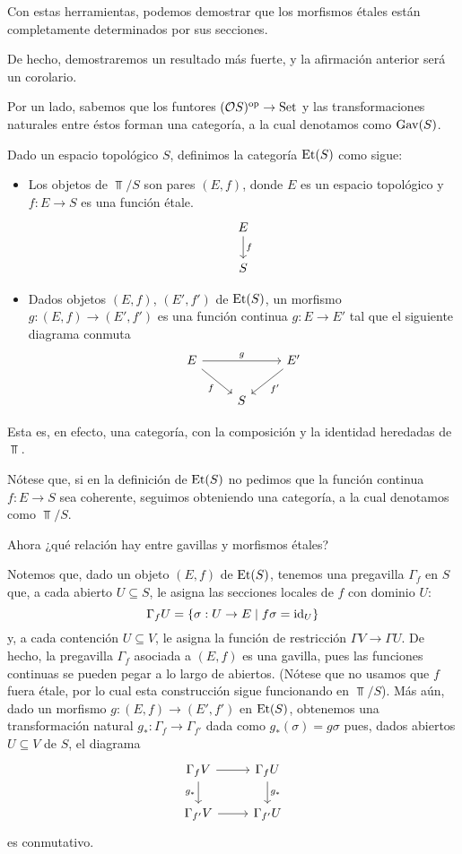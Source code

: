 Con estas herramientas,
podemos demostrar que los morfismos étales
están completamente determinados por sus secciones.

De hecho, demostraremos un resultado más fuerte,
y la afirmación anterior será un corolario.

Por un lado, sabemos que los funtores $(\mathcal{O}S)^{\mathrm{op}}\to\mathrm{Set}$
y las transformaciones naturales entre éstos
forman una categoría, a la cual denotamos como $\operatorname{Gav}(S)$.

\begin{defn}
    Dado un espacio topológico $S$, definimos la categoría
    $\operatorname{Et}(S)$ como sigue:
    \begin{itemize}
        \item
        Los objetos de $\Top/S$ son pares $(E,f)$,
        donde $E$ es un espacio topológico
        y $f:E\to S$ es una función étale.
        \[
            \begin{tikzcd}
                E \ar[d,"f"] \\ S
            \end{tikzcd}
        \]
        \item
        Dados objetos $(E,f)$, $(E',f')$ de $\operatorname{Et}(S)$,
        un morfismo $g:(E,f)\to(E',f')$ es una función
        continua $g:E\to E'$ tal que el siguiente diagrama conmuta
        \[
            \begin{tikzcd}
                E \ar[dr,"f"'] \ar[rr,"g"] && E' \ar[dl,"f'"]
                \\ & S
            \end{tikzcd}
        \]
    \end{itemize}
    Esta es, en efecto, una categoría,
    con la composición y la identidad
    heredadas de $\Top$.
    
    Nótese que, si en la definición de $\operatorname{Et}(S)$
    no pedimos que la función continua $f:E\to S$ sea coherente,
    seguimos obteniendo una categoría,
    a la cual denotamos como $\Top/S$.
\end{defn}

Ahora ¿qué relación hay entre gavillas y morfismos étales?

Notemos que, dado un objeto $(E,f)$ de $\operatorname{Et}(S)$,
tenemos una pregavilla $\Gamma_f$ en $S$ que,
a cada abierto $U\subseteq S$, le asigna las secciones locales
de $f$ con dominio $U$:
\[
    \Gamma_f U = \{\sigma:U\to E\mid f\sigma = \mathrm{id}_U\}
\]
y, a cada contención $U\subseteq V$, le asigna
la función de restricción $\Gamma V\to\Gamma U$.
De hecho, la pregavilla $\Gamma_f$ asociada a $(E,f)$ es una gavilla,
pues las funciones continuas se pueden pegar a lo largo de abiertos.
(Nótese que no usamos que $f$ fuera étale, por lo cual esta
construcción sigue funcionando en $\Top/S$).
Más aún, dado un morfismo $g:(E,f)\to(E',f')$ en $\operatorname{Et}(S)$,
obtenemos una transformación natural $g_*:\Gamma_f\to\Gamma_{f'}$
dada como $g_*(\sigma)=g\sigma$ pues,
dados abiertos $U\subseteq V$ de $S$, el diagrama
\[
    \begin{tikzcd}
        \Gamma_fV \ar[d,"g_*"'] \ar[r] & \Gamma_fU \ar[d,"g_*"] \\
        \Gamma_{f'}V \ar[r] & \Gamma_{f'}U
    \end{tikzcd}
\]
es conmutativo.

